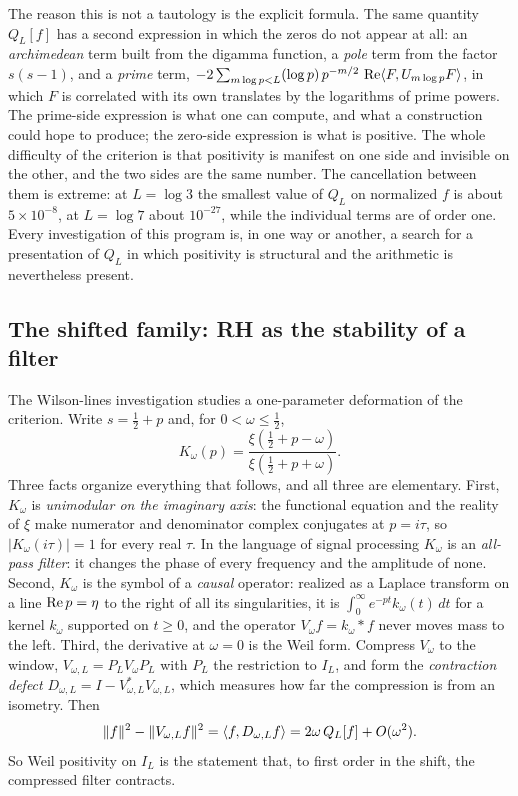 The reason this is not a tautology is the explicit formula. The same quantity
$Q_L[f]$ has a second expression in which the zeros do not appear at all: an
\emph{archimedean} term built from the digamma function, a \emph{pole} term
from the factor $s(s-1)$, and a \emph{prime} term,
$-2\sum_{m\log p<L}(\log p)\,p^{-m/2}\,\operatorname{Re}\langle F,U_{m\log p}F\rangle$, in which $F$ is
correlated with its own translates by the logarithms of prime powers. The
prime-side expression is what one can compute, and what a construction could
hope to produce; the zero-side expression is what is positive. The whole
difficulty of the criterion is that positivity is manifest on one side and
invisible on the other, and the two sides are the same number. The cancellation
between them is extreme: at $L=\log 3$ the smallest value of $Q_L$ on
normalized $f$ is about $5\times10^{-8}$, at $L=\log 7$ about
$10^{-27}$, while the individual terms are of order one. Every investigation of
this program is, in one way or another, a search for a presentation of $Q_L$ in
which positivity is structural and the arithmetic is nevertheless present.

\subsection{The shifted family: RH as the stability of a filter}

The Wilson-lines investigation \cite{WilsonLines} studies a one-parameter
deformation of the criterion. Write $s=\frac12+p$ and, for $0<\omega\leq\frac12$,
\begin{equation}\label{eq:intro-transfer}
 K_\omega(p)=\frac{\xi(\tfrac12+p-\omega)}{\xi(\tfrac12+p+\omega)} .
\end{equation}
Three facts organize everything that follows, and all three are elementary.
First, $K_\omega$ is \emph{unimodular on the imaginary axis}: the functional
equation and the reality of $\xi$ make numerator and denominator complex
conjugates at $p=i\tau$, so $|K_\omega(i\tau)|=1$ for every real $\tau$. In the
language of signal processing $K_\omega$ is an \emph{all-pass filter}: it
changes the phase of every frequency and the amplitude of none. Second,
$K_\omega$ is the symbol of a \emph{causal} operator: realized as a Laplace
transform on a line $\operatorname{Re} p=\eta$ to the right of all its singularities, it is
$\int_0^\infty e^{-pt}k_\omega(t)\,dt$ for a kernel $k_\omega$ supported on
$t\geq0$, and the operator $V_\omega f=k_\omega*f$ never moves mass to the left.
Third, the derivative at $\omega=0$ is the Weil form. Compress $V_\omega$ to the
window, $V_{\omega,L}=P_LV_\omega P_L$ with $P_L$ the restriction to $I_L$, and
form the \emph{contraction defect} $D_{\omega,L}=I-V_{\omega,L}^*V_{\omega,L}$,
which measures how far the compression is from an isometry. Then
\begin{equation}\label{eq:intro-firstorder}
 \lVert f\rVert^2-\lVert V_{\omega,L}f\rVert^2=\langle f,D_{\omega,L}f\rangle=2\omega\,Q_L[f]+O(\omega^2).
\end{equation}
So Weil positivity on $I_L$ is the statement that, to first order in the shift,
the compressed filter contracts.

